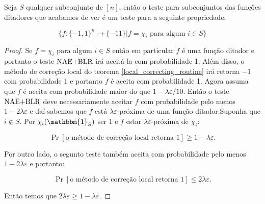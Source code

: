 \begin{teo}

Seja $S$ qualquer subconjunto de $[n]$, então o teste para subconjuntos das funções ditadores que acabamos de ver é um teste para a seguinte propriedade:

\begin{equation*}
	\{f: \{-1, 1\}^{n} \to \{-1 1\} \lvert f = \chi_{i} \text{ para algum } i \in S\}
\end{equation*}

\end{teo}

\begin{proof}

Se $f = \chi_{i}$ para algum $i \in S$ então em particular $f$ é uma função ditador e portanto o teste $\text{NAE+BLR}$ irá aceitá-la com probabilidade 1. Além disso, o método de correção local do teorema \ref{local_correcting_routine} irá retorna $-1$ com probabilidade 1 e portanto $f$ é aceita com probabilidade 1. Agora assuma que $f$ é aceita com probabilidade maior do que $1 - \lambda\varepsilon/10$. Então o teste $\text{NAE+BLR}$ deve necessariamente aceitar $f$ com probabilidade pelo menos $1 - 2\lambda\varepsilon$ e daí sabemos que $f$ está $\lambda\varepsilon$-próxima de uma função ditador.Suponha que $i \not\in S$. Por $\chi_{i}(\mathbbm{1}_{S})$ ser 1 e $f$ estar $\lambda\varepsilon$-próxima de $\chi_{i}$:

\begin{equation*}
	\Pr[\text{o método de correção local retorna } 1] \geq 1 - \lambda\varepsilon.
\end{equation*}

Por outro lado, o segunto teste também aceita com probabilidade pelo menos $1 - 2\lambda\varepsilon$ e portanto:

\begin{equation*}
	\Pr[\text{o método de correção local retorna } 1] \leq 2\lambda\varepsilon.
\end{equation*}

Então temos que $2\lambda\varepsilon \geq 1 - \lambda\varepsilon$.

\end{proof}